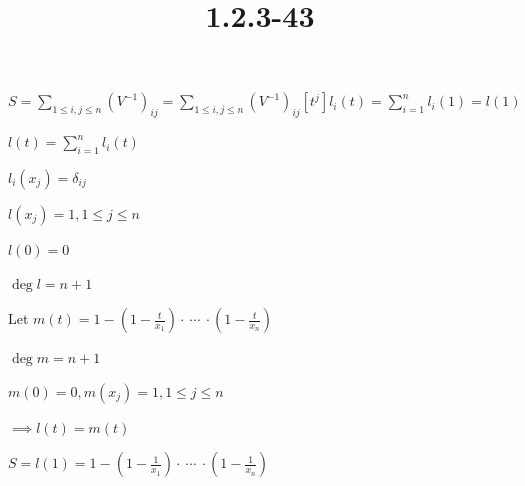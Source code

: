 \documentclass{article}
\title{1.2.3-43}
\begin{document}
\maketitle

\( S = \sum_{1 \leq i,j \leq n} (V^{-1})_{ij} = \sum_{1 \leq i,j \leq n} (V^{-1})_{ij} [t^j]l_i(t) = \sum_{i=1}^n l_i(1) = l(1) \)

\( l(t) = \sum_{i=1}^n l_i(t) \)

\( l_i(x_j) = \delta_{ij} \)

\( l(x_j) = 1, 1 \leq j \leq n \)

\( l(0) = 0 \)

\( \deg l = n + 1 \)

Let \( m(t) = 1 - (1-\frac{t}{x_1}) \cdot\ \cdots\ \cdot (1-\frac{t}{x_n}) \)

\( \deg m = n + 1 \)

\( m(0) = 0, m(x_j) = 1, 1 \leq j \leq n \)

\( \implies l(t) = m(t) \)

\( S = l(1) = 1 - (1-\frac{1}{x_1}) \cdot\ \cdots\ \cdot (1-\frac{1}{x_n}) \)
\end{document}
